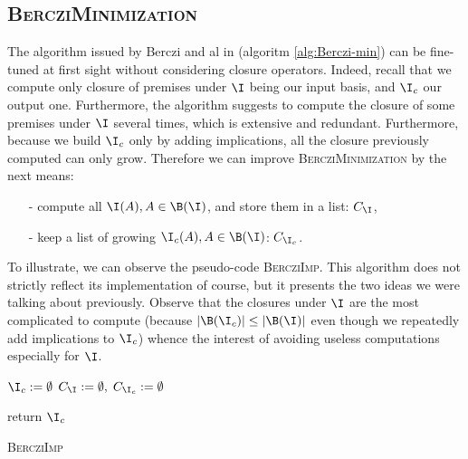 \begin{figure}[H]
	
\end{figure}

\subsection{\textsc{BercziMinimization}}

The algorithm issued by Berczi and al in \cite{berczi_directed_2017} (algoritm \ref{alg:Berczi-min}) can be fine-tuned at first sight without considering closure operators. Indeed, recall that we compute only closure of premises under
$\I$ being our input basis, and $\I_c$ our output one. Furthermore, the algorithm suggests to compute the closure of some premises under $\I$ several 
times, which is extensive and redundant. Furthermore, because we build $\I_c$ only by adding implications, all the closure previously computed can only grow.
Therefore we can improve \textsc{BercziMinimization} by the next means:
\begin{itemize}
	\item[-] compute all $\I(A), A \in \B(\I)$, and store them in a list: $C_{\I}$,
	\item[-] keep a list of growing $\I_c(A), A \in \B(\I)$: $C_{\I_c}$.
\end{itemize}
\noindent To illustrate, we can observe the pseudo-code \textsc{BercziImp}. This algorithm does not strictly reflect its implementation of course, but it
presents the two ideas we were talking about previously. Observe that the closures under $\I$ are the most complicated to compute (because $|\B(\I_c)| \leq |\B(\I)|$ even though we repeatedly add implications to $\I_c$) whence
the interest of avoiding useless computations especially for $\I$.

\begin{algorithm}
	
	\BlankLine
	\BlankLine
	
	$\I_c := \emptyset$ \;
	$C_{\I} := \emptyset, \; C_{\I_c} := \emptyset $ \;
	

	\BlankLine
	

	\BlankLine
	
	return $\I_c$ \;
	
	\caption{\textsc{BercziImp}}
	\label{alg:Berczi-imp}
\end{algorithm}

